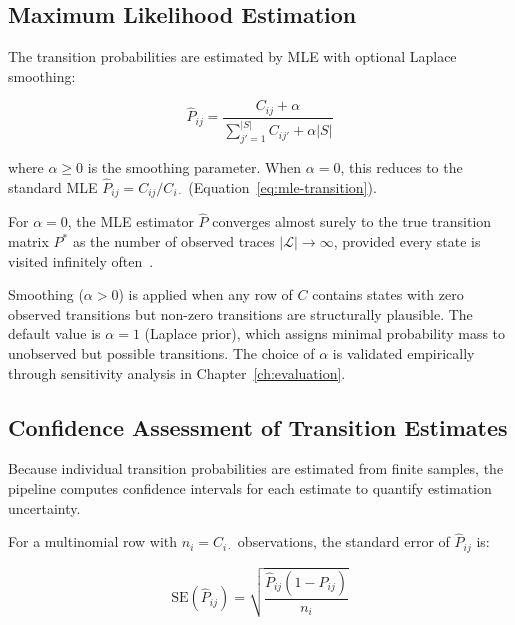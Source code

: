 \subsection{Maximum Likelihood Estimation}
\label{sec:s3-mle}

The transition probabilities are estimated by MLE with optional Laplace 
smoothing:

\begin{equation}
\label{eq:mle-full}
\hat{P}_{ij} = \frac{C_{ij} + \alpha}{\sum_{j'=1}^{|S|} C_{ij'} + \alpha |S|}
\end{equation}

where $\alpha \geq 0$ is the smoothing parameter. When $\alpha = 0$, 
this reduces to the standard MLE $\hat{P}_{ij} = C_{ij} / C_{i \cdot}$ 
(Equation~\ref{eq:mle-transition}).

\begin{property}
\label{prop:mle-consistency}
For $\alpha = 0$, the MLE estimator $\hat{P}$ converges almost surely to 
the true transition matrix $P^*$ as the number of observed traces 
$|\mathcal{L}| \to \infty$, provided every state is visited infinitely 
often~\cite{Spedicato2017}.
\end{property}

Smoothing ($\alpha > 0$) is applied when any row of $C$ contains states 
with zero observed transitions but non-zero transitions are structurally 
plausible. The default value is $\alpha = 1$ (Laplace prior), which 
assigns minimal probability mass to unobserved but possible transitions. 
The choice of $\alpha$ is validated empirically through sensitivity 
analysis in Chapter~\ref{ch:evaluation}.


\subsection{Confidence Assessment of Transition Estimates}
\label{sec:s3-confidence}

Because individual transition probabilities are estimated from finite 
samples, the pipeline computes confidence intervals for each estimate 
to quantify estimation uncertainty.

For a multinomial row with $n_i = C_{i \cdot}$ observations, the 
standard error of $\hat{P}_{ij}$ is:

\begin{equation}
\label{eq:se-transition}
\text{SE}(\hat{P}_{ij}) = \sqrt{\frac{\hat{P}_{ij}(1 - \hat{P}_{ij})}{n_i}}
\end{equation}

